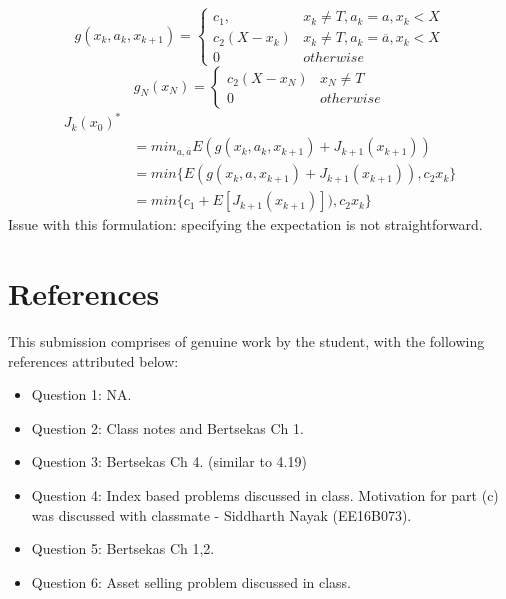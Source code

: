 \documentclass[12pt]{article}
\begin{document}
\[ g(x_k,a_k,x_{k+1}) = \begin{cases} 
          c_1, & x_k \neq  T, a_k=a , x_k < X\\
           c_2(X-x_k) & x_k \neq  T, a_k=\overline{a}, x_k < X\\
          0 & otherwise
       \end{cases}
    \]
    \[ g_N(x_N) = \begin{cases} 
           c_2(X -x_N ) & x_N \neq  T \\
          0 & otherwise
       \end{cases}
    \]
    \begin{align*}
J_k(x_0)^* \\
& = min_{a,\overline{a}}E( g(x_k,a_k,x_{k+1}) + J_{k+1}(x_{k+1})) \\
& = min \{ E( g(x_k,a,x_{k+1}) + J_{k+1}(x_{k+1}) ), c_2x_k \} \\
&= min \{ c_1 +E[ J_{k+1}(x_{k+1})]), c_2x_k \}
\end{align*}
    Issue with this formulation: specifying the expectation is not straightforward.
 
 \section{References}

This submission comprises of genuine work by the student, with the following references attributed below:

\begin{itemize}
\item Question 1: NA.
\item Question 2: Class notes and Bertsekas Ch 1.
\item Question 3: Bertsekas Ch 4. (similar to 4.19)
\item Question 4: Index based problems discussed in class. Motivation for part (c) was discussed with classmate - Siddharth Nayak (EE16B073).
\item Question 5: Bertsekas Ch 1,2.
\item Question 6: Asset selling problem discussed in class.
\end{itemize}
    
\end{document}
